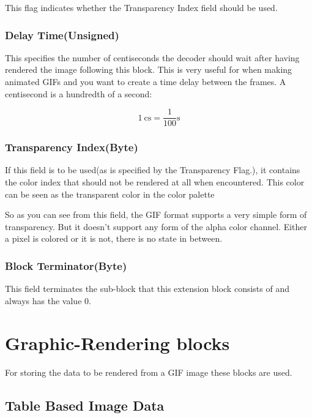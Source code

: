 This flag indicates whether the Transparency Index field should be
used.

\subsubsection{Delay Time(Unsigned)}

This specifies the number of centiseconds the decoder should wait
after having rendered the image following this block. This is very
useful for when making animated GIFs and you want to create a time
delay between the frames. A centisecond is a hundredth of a second:

\begin{equation*}
  \SI{1}{\centi\second} = \frac{1}{100}\si{\second}
\end{equation*}

\subsubsection{Transparency Index(Byte)}

If this field is to be used(as is specified by the Transparency
Flag.), it contains the color index that should not be rendered at all
when encountered. This color can be seen as the transparent color in
the color palette

So as you can see from this field, the GIF format supports a very
simple form of transparency. But it doesn't support any form of the
alpha color channel. Either a pixel is colored or it is not, there is
no state in between.

\subsubsection{Block Terminator(Byte)}

This field terminates the sub-block that this extension block
consists of and always has the value $0$.

\section{Graphic-Rendering blocks}

For storing the data to be rendered from a GIF image these blocks
are used.

\subsection{Table Based Image Data}

